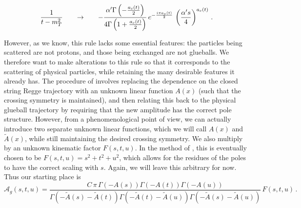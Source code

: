\documentclass[aps, prd, preprintnumbers, floatfix, showpacs, showkeys, nofootinbib, 10pt]{revtex4-1}
\def\beq{\begin{equation}}
\def\eeq{\end{equation}}
\begin{document}
\beq
\frac{1}{t - m_T^2} \hspace{.25in} \rightarrow \hspace{.25in} -\frac{\alpha' \Gamma\left(-\frac{a_c(t)}{2}\right)}{4\Gamma\left(1 + \frac{a_c(t)}{2}\right)} \, e^{-\frac{i\pi a_c(t)}{2}} \, \left(\frac{\alpha' s}{4}\right)^{a_c(t)} \, .
\eeq

However, as we know, this rule lacks some essential features: the particles being scattered are not protons, and those being exchanged are not glueballs.  We therefore want to make alterations to this rule so that it corresponds to the scattering of physical particles, while retaining the many desirable features it already has.  The procedure of \cite{DHM} involves replacing the dependence on the closed string Regge trajectory with an unknown linear function $A(x)$ (such that the crossing symmetry is maintained), and then relating this back to the physical glueball trajectory by requiring that the new amplitude has the correct pole structure.  However, from a phenomenological point of view, we can actually introduce two separate unknown linear functions, which we will call $A(x)$ and $\tilde{A}(x)$, while still maintaining the desired crossing symmetry.  We also multiply by an unknown kinematic factor $F(s, t, u)$.  In the method of \cite{DHM}, this is eventually chosen to be $F(s, t, u) = s^2 + t^2 + u^2$, which allows for the residues of the poles to have the correct scaling with $s$.  Again, we will leave this arbitrary for now.  Thus our starting place is
\beq
\label{eqn:VSgxs}
\mathcal{A}_g(s, t, u) = \frac{C \, \pi \, \Gamma\left(-A(s)\right)\Gamma\left(-A(t)\right)\Gamma\left(-A(u)\right)}{\Gamma\left(-\tilde{A}(s) - \tilde{A}(t)\right)\Gamma\left(-\tilde{A}(t) - \tilde{A}(u)\right)\Gamma\left(-\tilde{A}(s) - \tilde{A}(u)\right)} \, F(s, t, u) \, .
\eeq
\end{document}
